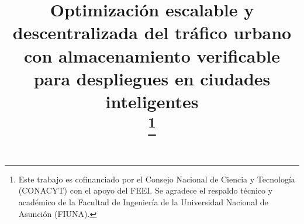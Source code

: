 \documentclass[conference]{IEEEtran}
\begin{document}
\title{Optimización escalable y descentralizada del tráfico urbano con almacenamiento verificable para despliegues en ciudades inteligentes \\
\thanks{Este trabajo es cofinanciado por el Consejo Nacional de Ciencia y Tecnología (CONACYT) con el apoyo del FEEI. Se agradece el respaldo técnico y académico de la Facultad de Ingeniería de la Universidad Nacional de Asunción (FIUNA).}}

\author{
}

\maketitle

\begin{abstract}
\end{abstract}

\begin{IEEEkeywords}
\end{IEEEkeywords}
\end{document}
